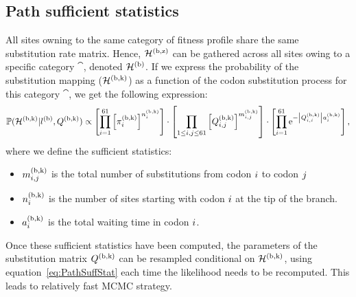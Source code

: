 \subsection{Path sufficient statistics}
All sites owning to the same category of fitness profile share the same {substitution} rate matrix.
Hence, $\mathcal{H}^{(\text{b}, \text{z})}$ can be gathered across all sites owing to a specific category $\cat$, denoted $\mathcal{H}^{(\text{b})}$.
If we express the probability of the {substitution} mapping ($\mathcal{H}^{(\text{b}, \text{k})}$) as a function of the {codon} {substitution} process for this category $\cat$, we get the following expression:
\begin{equation}
    \label{eq:PathSuffStat}
    \mathbb{P} (\mathcal{H}^{(\text{b}, \text{k})} | l^{(\text{b})}, Q^{(\text{b}, \text{k})}) \propto \left[  \prod\limits_{{i}=1}^{61} \left[\pi_{{i}}^{(\text{b}, \text{k})}\right]^{n_{{i}}^{(\text{b}, \text{k})}} \right] \cdot \left[ \prod\limits_{ 1 \leq {i}, {j} \leq 61} \left[Q^{(\text{b}, \text{k})}_{{i}, {j}}\right]^{m_{{i}, {j}}^{(\text{b}, \text{k})}} \right] \cdot \left[ \prod\limits_{{i}=1}^{61} \text{e}^{- \left| Q^{(\text{b}, \text{k})}_{{i}, {i}}\right| a_{{i}}^{(\text{b}, \text{k})}}\right],
\end{equation}
where we define the sufficient statistics:
\begin{itemize}
    \setlength\itemsep{-0.25em}
    \item $m_{{i}, {j}}^{(\text{b}, \text{k})}$ is the total number of substitutions from {codon} ${i}$ to {codon} ${j}$
    \item $n_{{i}}^{(\text{b}, \text{k})}$ is the number of sites starting with {codon} ${i}$ at the tip of the branch.
    \item $a_{{i}}^{(\text{b}, \text{k})}$ is the total waiting time in {codon} ${i}$.
\end{itemize}
Once these sufficient statistics have been computed, the parameters of the {substitution} matrix $Q^{(\text{b}, \text{k})}$ can be resampled conditional on $\mathcal{H}^{(\text{b}, \text{k})}$,
using equation~\ref{eq:PathSuffStat} each time the {likelihood} needs to be recomputed. This leads to relatively fast {MCMC} strategy.

